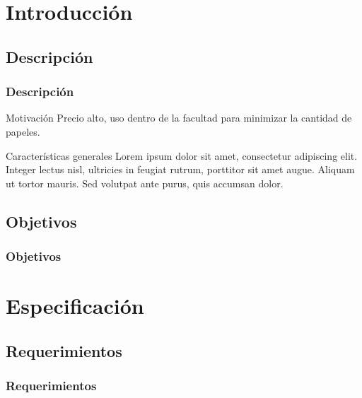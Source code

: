 \section{Introducción} 

\subsection{Descripción}
 

\begin{frame}
	\frametitle{Descripción}
	
		\begin{block}{Motivación}
			Precio alto, uso dentro de la facultad para minimizar la cantidad de papeles.
		\end{block}

		\begin{block}{Características generales}
			Lorem ipsum dolor sit amet, consectetur adipiscing elit. Integer lectus nisl, ultricies in feugiat rutrum, porttitor sit amet augue. Aliquam ut tortor mauris. Sed volutpat ante purus, quis accumsan dolor.
		\end{block}

\end{frame}

\subsection{Objetivos}
\begin{frame}
	\frametitle{Objetivos}

\end{frame}

\section{Especificación}

\subsection{Requerimientos}
\begin{frame}
	\frametitle{Requerimientos}

\end{frame}

